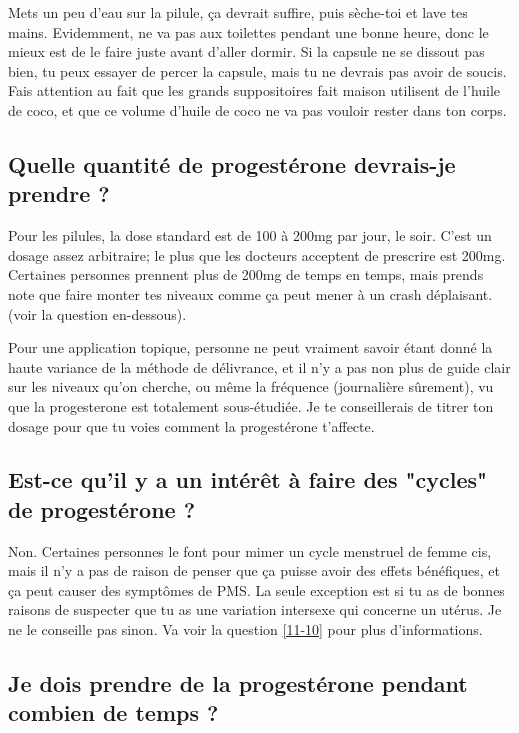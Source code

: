 \documentclass{article}
\begin{document}
Mets un peu d'eau sur la pilule, ça devrait suffire, puis sèche-toi et lave tes mains. Evidemment, ne va pas aux toilettes pendant une bonne heure, donc le mieux est de le faire juste avant d'aller dormir. Si la capsule ne se dissout pas bien, tu peux essayer de percer la capsule, mais tu ne devrais pas avoir de soucis. Fais attention au fait que les grands suppositoires fait maison utilisent de l'huile de coco, et que ce volume d'huile de coco ne va pas vouloir rester dans ton corps.

\subsection{Quelle quantité de progestérone devrais-je prendre ?}

Pour les pilules, la dose standard est de 100 à 200mg par jour, le soir. C'est un dosage assez arbitraire; le plus que les docteurs acceptent de prescrire est 200mg. Certaines personnes prennent plus de 200mg de temps en temps, mais prends note que faire monter tes niveaux comme ça peut mener à un crash déplaisant. (voir la question en-dessous).

Pour une application topique, personne ne peut vraiment savoir étant donné la haute variance de la méthode de délivrance, et il n'y a pas non plus de guide clair sur les niveaux qu'on cherche, ou même la fréquence (journalière sûrement), vu que la progesterone est totalement sous-étudiée. Je te conseillerais de titrer ton dosage pour que tu voies comment la progestérone t'affecte.

\subsection{Est-ce qu'il y a un intérêt à faire des "cycles" de progestérone ?}\label{8-11}

Non. Certaines personnes le font pour mimer un cycle menstruel de femme cis, mais il n'y a pas de raison de penser que ça puisse avoir des effets bénéfiques, et ça peut causer des symptômes de PMS. La seule exception est si tu as de bonnes raisons de suspecter que tu as une variation intersexe qui concerne un utérus. Je ne le conseille pas sinon. Va voir la question \ref{11-10} pour plus d'informations.

\subsection{Je dois prendre de la progestérone pendant combien de temps ?}
\end{document}

